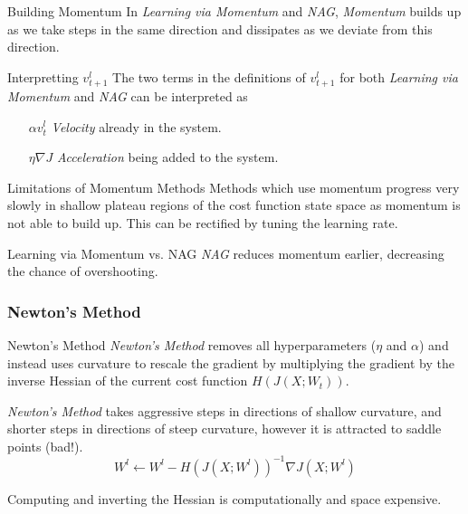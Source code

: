 \documentclass[11pt,a4paper]{article}
\begin{document}
  \begin{remark}{Building Momentum}
    In \textit{Learning via Momentum} and \textit{NAG}, \textit{Momentum} builds up as we take steps in the same direction and dissipates as we deviate from this direction.
  \end{remark}

  \begin{remark}{Interpretting $v_{t+1}^l$}
    The two terms in the definitions of $v_{t+1}^l$ for both \textit{Learning via Momentum} and \textit{NAG} can be interpreted as
    \begin{itemize}
      \item[$\alpha v_t^l$] \textit{Velocity} already in the system.
      \item[$\eta\nabla J$] \textit{Acceleration} being added to the system.
    \end{itemize}
  \end{remark}

  \begin{remark}{Limitations of Momentum Methods}
    Methods which use momentum progress very slowly in shallow plateau regions of the cost function state space as momentum is not able to build up. This can be rectified by tuning the learning rate.
  \end{remark}

  \begin{remark}{Learning via Momentum vs. NAG}
    \textit{NAG} reduces momentum earlier, decreasing the chance of overshooting.
  \end{remark}

\subsubsection{Newton's Method} \label{sec_NewtonMethod}

  \begin{proposition}{Newton's Method}
    \textit{Newton's Method} removes all hyperparameters ($\eta$ and $\alpha$) and instead uses curvature to rescale the gradient by multiplying the gradient by the inverse Hessian of the current cost function $H(J(X;W_t))$.
    \par \textit{Newton's Method} takes aggressive steps in directions of shallow curvature, and shorter steps in directions of steep curvature, however it is attracted to saddle points (bad!).
    \[ W^l\leftarrow W^l- H(J(X;W^l))^{-1}\nabla J(X;W^l) \]
    \par Computing and inverting the Hessian is computationally and space expensive.
  \end{proposition}
\end{document}
